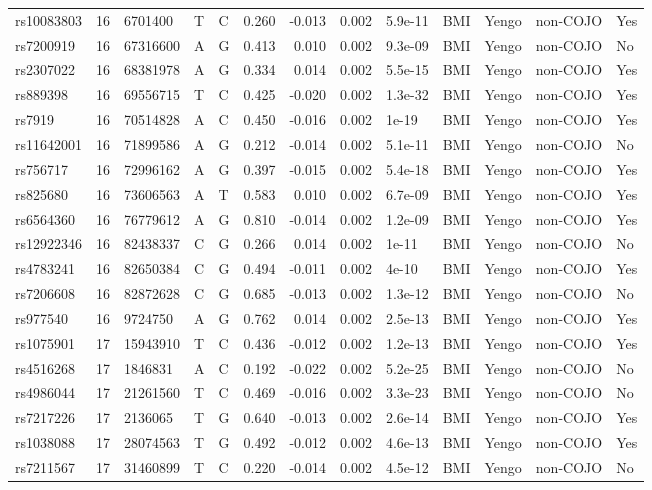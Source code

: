 \documentclass[11pt,twoside]{bristolthesis}
\begin{document}
\begin{longtable}[t]{lrlllrrrlllll}
rs10083803 & 16 & 6701400 & T & C & 0.260 & -0.013 & 0.002 & 5.9e-11 & BMI & Yengo & non-COJO & Yes\\
rs7200919 & 16 & 67316600 & A & G & 0.413 & 0.010 & 0.002 & 9.3e-09 & BMI & Yengo & non-COJO & No\\
rs2307022 & 16 & 68381978 & A & G & 0.334 & 0.014 & 0.002 & 5.5e-15 & BMI & Yengo & non-COJO & Yes\\
\addlinespace
rs889398 & 16 & 69556715 & T & C & 0.425 & -0.020 & 0.002 & 1.3e-32 & BMI & Yengo & non-COJO & Yes\\
rs7919 & 16 & 70514828 & A & C & 0.450 & -0.016 & 0.002 & 1e-19 & BMI & Yengo & non-COJO & Yes\\
rs11642001 & 16 & 71899586 & A & G & 0.212 & -0.014 & 0.002 & 5.1e-11 & BMI & Yengo & non-COJO & No\\
rs756717 & 16 & 72996162 & A & G & 0.397 & -0.015 & 0.002 & 5.4e-18 & BMI & Yengo & non-COJO & Yes\\
rs825680 & 16 & 73606563 & A & T & 0.583 & 0.010 & 0.002 & 6.7e-09 & BMI & Yengo & non-COJO & Yes\\
\addlinespace
rs6564360 & 16 & 76779612 & A & G & 0.810 & -0.014 & 0.002 & 1.2e-09 & BMI & Yengo & non-COJO & Yes\\
rs12922346 & 16 & 82438337 & C & G & 0.266 & 0.014 & 0.002 & 1e-11 & BMI & Yengo & non-COJO & No\\
rs4783241 & 16 & 82650384 & C & G & 0.494 & -0.011 & 0.002 & 4e-10 & BMI & Yengo & non-COJO & Yes\\
rs7206608 & 16 & 82872628 & C & G & 0.685 & -0.013 & 0.002 & 1.3e-12 & BMI & Yengo & non-COJO & No\\
rs977540 & 16 & 9724750 & A & G & 0.762 & 0.014 & 0.002 & 2.5e-13 & BMI & Yengo & non-COJO & Yes\\
\addlinespace
rs1075901 & 17 & 15943910 & T & C & 0.436 & -0.012 & 0.002 & 1.2e-13 & BMI & Yengo & non-COJO & Yes\\
rs4516268 & 17 & 1846831 & A & C & 0.192 & -0.022 & 0.002 & 5.2e-25 & BMI & Yengo & non-COJO & No\\
rs4986044 & 17 & 21261560 & T & C & 0.469 & -0.016 & 0.002 & 3.3e-23 & BMI & Yengo & non-COJO & No\\
rs7217226 & 17 & 2136065 & T & G & 0.640 & -0.013 & 0.002 & 2.6e-14 & BMI & Yengo & non-COJO & Yes\\
rs1038088 & 17 & 28074563 & T & G & 0.492 & -0.012 & 0.002 & 4.6e-13 & BMI & Yengo & non-COJO & Yes\\
\addlinespace
rs7211567 & 17 & 31460899 & T & C & 0.220 & -0.014 & 0.002 & 4.5e-12 & BMI & Yengo & non-COJO & No\\

\end{longtable}
\end{document}
